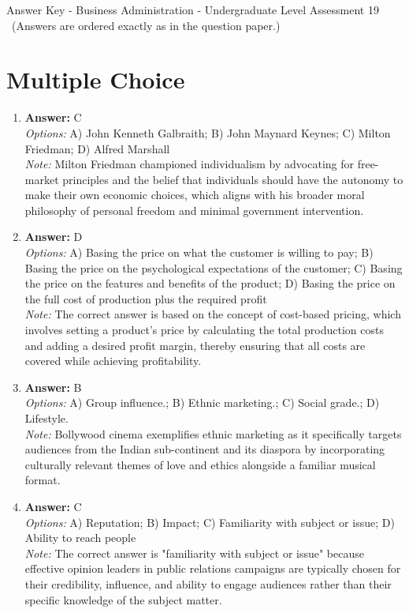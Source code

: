 \documentclass[12pt]{article}
\begin{document}
\begin{center}
Answer Key - Business Administration - Undergraduate Level Assessment 19 \
\small (Answers are ordered exactly as in the question paper.)
\end{center}

\section*{Multiple Choice}
\begin{enumerate}[label=\arabic*.]
\item \textbf{Answer:} C
\\ \textit{Options:} A) John Kenneth Galbraith; B) John Maynard Keynes; C) Milton Friedman; D) Alfred Marshall
\\ \textit{Note:} Milton Friedman championed individualism by advocating for free-market principles and the belief that individuals should have the autonomy to make their own economic choices, which aligns with his broader moral philosophy of personal freedom and minimal government intervention.
\item \textbf{Answer:} D
\\ \textit{Options:} A) Basing the price on what the customer is willing to pay; B) Basing the price on the psychological expectations of the customer; C) Basing the price on the features and benefits of the product; D) Basing the price on the full cost of production plus the required profit
\\ \textit{Note:} The correct answer is based on the concept of cost-based pricing, which involves setting a product's price by calculating the total production costs and adding a desired profit margin, thereby ensuring that all costs are covered while achieving profitability.
\item \textbf{Answer:} B
\\ \textit{Options:} A) Group influence.; B) Ethnic marketing.; C) Social grade.; D) Lifestyle.
\\ \textit{Note:} Bollywood cinema exemplifies ethnic marketing as it specifically targets audiences from the Indian sub-continent and its diaspora by incorporating culturally relevant themes of love and ethics alongside a familiar musical format.
\item \textbf{Answer:} C
\\ \textit{Options:} A) Reputation; B) Impact; C) Familiarity with subject or issue; D) Ability to reach people
\\ \textit{Note:} The correct answer is "familiarity with subject or issue" because effective opinion leaders in public relations campaigns are typically chosen for their credibility, influence, and ability to engage audiences rather than their specific knowledge of the subject matter.

\end{enumerate}
\end{document}

